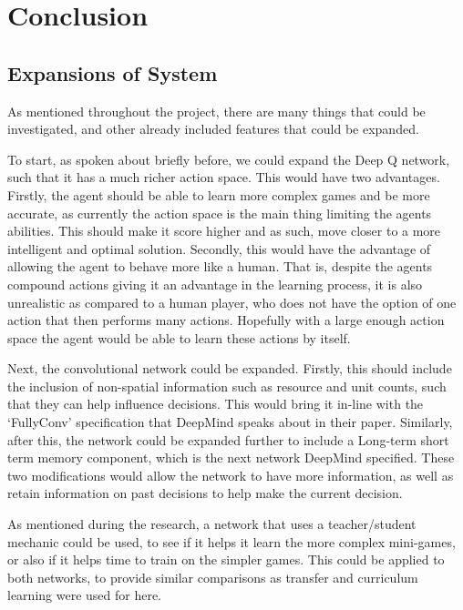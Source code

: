 \chapter{Conclusion}%
\label{conclusion}

\section{Expansions of System}

As mentioned throughout the project, there are many things that could be
investigated, and other already included features that could be expanded.

To start, as spoken about briefly before, we could expand the Deep Q network,
such that it has a much richer action space. This would have two advantages.
Firstly, the agent should be able to learn more complex games and be more
accurate, as currently the action space is the main thing limiting the agents abilities. This should make it score higher and as such, move closer to a more
intelligent and optimal solution. Secondly, this would have the advantage of
allowing the agent to behave more like a human. That is, despite the agents
compound actions giving it an advantage in the learning process, it is also
unrealistic as compared to a human player, who does not have the option of one
action that then performs many actions. Hopefully with a large enough action
space the agent would be able to learn these actions by itself.

Next, the convolutional network could be expanded. Firstly, this should include
the inclusion of non-spatial information such as resource and unit counts, such
that they can help influence decisions. This would bring it in-line with the
`FullyConv' specification that DeepMind speaks about in their paper. Similarly,
after this, the network could be expanded further to include a Long-term short
term memory component, which is the next network DeepMind specified. These two
modifications would allow the network to have more information, as well as
retain information on past decisions to help make the current decision.

As mentioned during the research, a network that uses a teacher/student mechanic
could be used, to see if it helps it learn the more complex mini-games, or also
if it helps time to train on the simpler games. This could be applied to both
networks, to provide similar comparisons as transfer and curriculum learning were
used for here.

